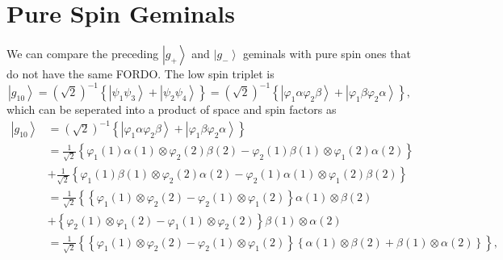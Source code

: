 \documentclass[aps,preprint]{revtex4}%
\begin{document}
\section{Pure Spin Geminals}

We can compare the preceding $\left\vert g_{+}\right\rangle $ and $\left\vert
g_{-}\right\rangle $ geminals with pure spin ones that do not have the same
FORDO. The low spin triplet is
\[
\left\vert g_{10}\right\rangle =\left(  \sqrt{2}\right)  ^{-1}\left\{
\left\vert \psi_{1}\psi_{3}\right\rangle +\left\vert \psi_{2}\psi
_{4}\right\rangle \right\}  =\left(  \sqrt{2}\right)  ^{-1}\left\{  \left\vert
\varphi_{1}\alpha\varphi_{2}\beta\right\rangle +\left\vert \varphi_{1}%
\beta\varphi_{2}\alpha\right\rangle \right\}  ,
\]
which can be seperated into a product of space and spin factors as%
\begin{align}
\left\vert g_{10}\right\rangle  &  =\left(  \sqrt{2}\right)  ^{-1}\left\{
\left\vert \varphi_{1}\alpha\varphi_{2}\beta\right\rangle +\left\vert
\varphi_{1}\beta\varphi_{2}\alpha\right\rangle \right\} \nonumber\\
&  =\frac{1}{\sqrt{2}}\left\{  \varphi_{1}\left(  1\right)  \alpha\left(
1\right)  \otimes\varphi_{2}\left(  2\right)  \beta\left(  2\right)
-\varphi_{2}\left(  1\right)  \beta\left(  1\right)  \otimes\varphi_{1}\left(
2\right)  \alpha\left(  2\right)  \right\} \nonumber\\
&  +\frac{1}{\sqrt{2}}\left\{  \varphi_{1}\left(  1\right)  \beta\left(
1\right)  \otimes\varphi_{2}\left(  2\right)  \alpha\left(  2\right)
-\varphi_{2}\left(  1\right)  \alpha\left(  1\right)  \otimes\varphi
_{1}\left(  2\right)  \beta\left(  2\right)  \right\} \nonumber\\
&  =\frac{1}{\sqrt{2}}\left\{  \left\{  \varphi_{1}\left(  1\right)
\otimes\varphi_{2}\left(  2\right)  -\varphi_{2}\left(  1\right)
\otimes\varphi_{1}\left(  2\right)  \right\}  \alpha\left(  1\right)
\otimes\beta\left(  2\right)  \right. \nonumber\\
&  +\left\{  \varphi_{2}\left(  1\right)  \otimes\varphi_{1}\left(  2\right)
-\varphi_{1}\left(  1\right)  \otimes\varphi_{2}\left(  2\right)  \right\}
\beta\left(  1\right)  \otimes\alpha\left(  2\right) \nonumber\\
&  =\frac{1}{\sqrt{2}}\left\{  \left\{  \varphi_{1}\left(  1\right)
\otimes\varphi_{2}\left(  2\right)  -\varphi_{2}\left(  1\right)
\otimes\varphi_{1}\left(  2\right)  \right\}  \left\{  \alpha\left(  1\right)
\otimes\beta\left(  2\right)  +\beta\left(  1\right)  \otimes\alpha\left(
2\right)  \right\}  \right\}  ,
\end{align}
\end{document}
